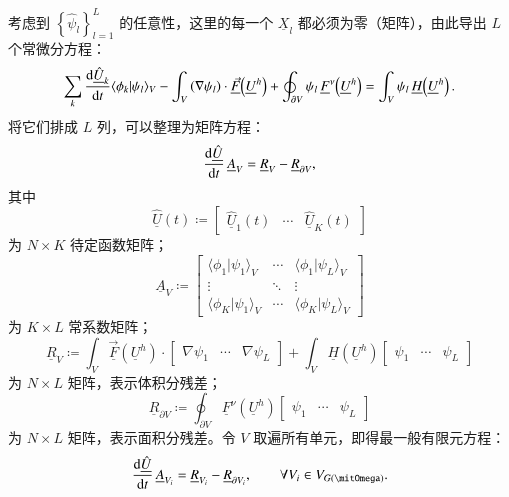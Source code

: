 考虑到 $\left\{ \hat{\psi}_{l}\right\} _{l=1}^{L}$ 的任意性，这里的每一个 $\underline{X}_{l}$
都必须为零（矩阵），由此导出 $L$ 个常微分方程：
\begin{equation}
\sum_{k}\dv{\underline{\hat{U}}_{k}}{t}\langle\phi_{k}\vert\psi_{l}\rangle_{V}-\int_{V}\left(\nabla\psi_{l}\right)\cdot\mathopen{\underline{\vec{F}}}\left(\underline{U}^{h}\right)+\oint_{\partial V}\psi_{l}\,\mathopen{\underline{F}^{\nu}}\left(\underline{U}^{h}\right)=\int_{V}\psi_{l}\,\mathopen{\underline{H}}\left(\underline{U}^{h}\right).
\end{equation}
将它们排成 $L$ 列，可以整理为矩阵方程：
\begin{equation}
\dv{\underline{\hat{U}}}{t}\,\underline{A}_{V}=\underline{R}_{V}-\underline{R}_{\partial V},
\end{equation}
其中
\begin{equation}
\underline{\hat{U}}(t)\coloneqq\begin{bmatrix}\underline{\hat{U}}_{1}(t) & \cdots & \underline{\hat{U}}_{K}(t)\end{bmatrix}
\end{equation}
为 $N\times K$ 待定函数矩阵；
\begin{equation}
\underline{A}_{V}\coloneqq\begin{bmatrix}\langle\phi_{1}\vert\psi_{1}\rangle_{V} & \cdots & \langle\phi_{1}\vert\psi_{L}\rangle_{V}\\
\vdots & \ddots & \vdots\\
\langle\phi_{K}\vert\psi_{1}\rangle_{V} & \cdots & \langle\phi_{K}\vert\psi_{L}\rangle_{V}
\end{bmatrix}\label{eq:coeff_matrix}
\end{equation}
为 $K\times L$ 常系数矩阵；
\begin{equation}
\underline{R}_{V}\coloneqq\int_{V}\mathopen{\underline{\vec{F}}}\left(\underline{U}^{h}\right)\cdot\begin{bmatrix}\nabla\psi_{1} & \cdots & \nabla\psi_{L}\end{bmatrix}+\int_{V}\mathopen{\underline{H}}\left(\underline{U}^{h}\right)\begin{bmatrix}\psi_{1} & \cdots & \psi_{L}\end{bmatrix}
\end{equation}
为 $N\times L$ 矩阵，表示体积分残差；
\begin{equation}
\underline{R}_{\partial V}\coloneqq\oint_{\partial V}\mathopen{\underline{F}^{\nu}}\left(\underline{U}^{h}\right)\begin{bmatrix}\psi_{1} & \cdots & \psi_{L}\end{bmatrix}
\end{equation}
为 $N\times L$ 矩阵，表示面积分残差。令
$V$ 取遍所有单元，即得最一般有限元方程：
\begin{equation}
\dv{\underline{\hat{U}}}{t}\,\underline{A}_{V_{i}}=\underline{R}_{V_{i}}-\underline{R}_{\partial V_{i}},\qquad\forall V_{i}\in V_{G(\varOmega)}.\label{eq:FEM}
\end{equation}


